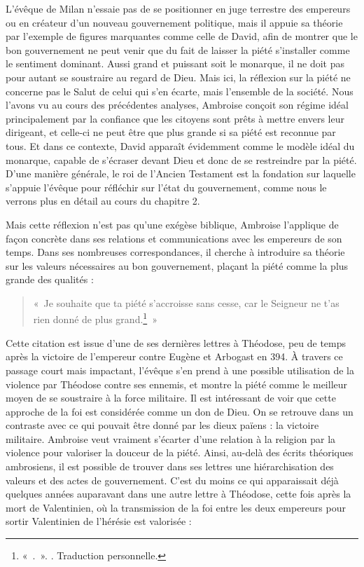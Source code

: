 \bigskip

L'évêque de Milan n'essaie pas de se positionner en juge terrestre des empereurs ou en créateur d'un nouveau gouvernement politique, mais il appuie sa théorie par l'exemple de figures marquantes comme celle de David, afin de montrer que le bon gouvernement ne peut venir que du fait de laisser la piété s'installer comme le sentiment dominant. Aussi grand et puissant soit le monarque, il ne doit pas pour autant se soustraire au regard de Dieu. Mais ici, la réflexion sur la piété ne concerne pas le Salut de celui qui s'en écarte, mais l'ensemble de la société. Nous l'avons vu au cours des précédentes analyses, Ambroise conçoit son régime idéal principalement par la confiance que les citoyens sont prêts à mettre envers leur dirigeant, et celle-ci ne peut être que plus grande si sa piété est reconnue par tous. Et dans ce contexte, David apparaît évidemment comme le modèle idéal du monarque, capable de s'écraser devant Dieu et donc de se restreindre par la piété. D'une manière générale, le roi de l'Ancien Testament est la fondation sur laquelle s'appuie l'évêque pour réfléchir sur l'état du gouvernement, comme nous le verrons plus en détail au cours du chapitre 2.

\bigskip

Mais cette réflexion n'est pas qu'une exégèse biblique, Ambroise l'applique de façon concrète dans ses relations et communications avec les empereurs de son temps. Dans ses nombreuses correspondances, il cherche à introduire sa théorie sur les valeurs nécessaires au bon gouvernement, plaçant la piété comme la plus grande des qualités :

\bigskip

\begin{quote}
    «~Je souhaite que ta piété s'accroisse sans cesse, car le Seigneur ne t'as rien donné de plus grand.\footnote{«~.~». \cite[\nopp ec 2, 7]{ambroise_csel_82_3}. Traduction personnelle.}~»
\end{quote}

\bigskip

Cette citation est issue d'une de ses dernières lettres à Théodose, peu de temps après la victoire de l'empereur contre Eugène et Arbogast en 394. À travers ce passage court mais impactant, l'évêque s'en prend à une possible utilisation de la violence par Théodose contre ses ennemis, et montre la piété comme le meilleur moyen de se soustraire à la force militaire. Il est intéressant de voir que cette approche de la foi est considérée comme un don de Dieu. On se retrouve dans un contraste avec ce qui pouvait être donné par les dieux païens : la victoire militaire. Ambroise veut vraiment s'écarter d'une relation à la religion par la violence pour valoriser la douceur de la piété. Ainsi, au-delà des écrits théoriques ambrosiens, il est possible de trouver dans ses lettres une hiérarchisation des valeurs et des actes de gouvernement. C'est du moins ce qui apparaissait déjà quelques années auparavant dans une autre lettre à Théodose, cette fois après la mort de Valentinien, où la transmission de la foi entre les deux empereurs pour sortir Valentinien de l'hérésie est valorisée :

